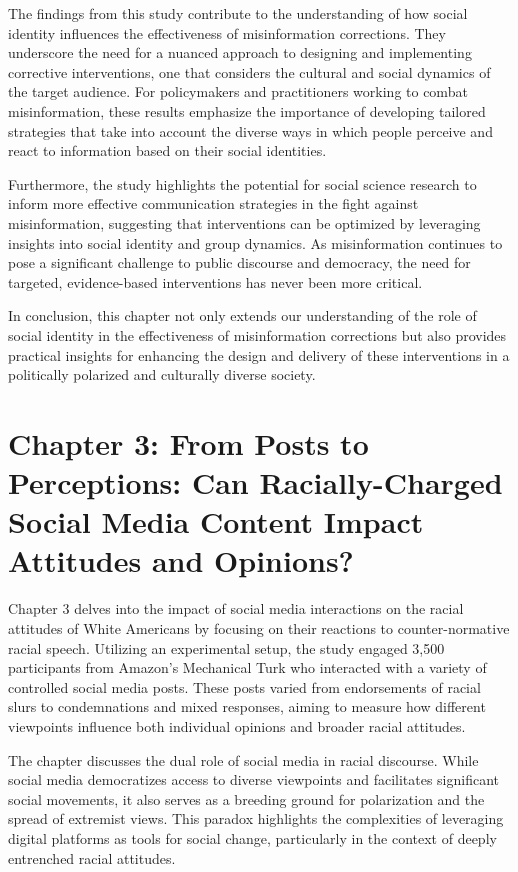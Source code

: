 \documentclass[12pt]{article}[1in]
\begin{document}
The findings from this study contribute to the understanding of how social identity influences the effectiveness of misinformation corrections. They underscore the need for a nuanced approach to designing and implementing corrective interventions, one that considers the cultural and social dynamics of the target audience. For policymakers and practitioners working to combat misinformation, these results emphasize the importance of developing tailored strategies that take into account the diverse ways in which people perceive and react to information based on their social identities.

Furthermore, the study highlights the potential for social science research to inform more effective communication strategies in the fight against misinformation, suggesting that interventions can be optimized by leveraging insights into social identity and group dynamics. As misinformation continues to pose a significant challenge to public discourse and democracy, the need for targeted, evidence-based interventions has never been more critical.

In conclusion, this chapter not only extends our understanding of the role of social identity in the effectiveness of misinformation corrections but also provides practical insights for enhancing the design and delivery of these interventions in a politically polarized and culturally diverse society.

\section*{Chapter 3: From Posts to Perceptions: Can Racially-Charged Social Media Content Impact Attitudes and Opinions?}

Chapter 3 delves into the impact of social media interactions on the racial attitudes of White Americans by focusing on their reactions to counter-normative racial speech. Utilizing an experimental setup, the study engaged 3,500 participants from Amazon's Mechanical Turk who interacted with a variety of controlled social media posts. These posts varied from endorsements of racial slurs to condemnations and mixed responses, aiming to measure how different viewpoints influence both individual opinions and broader racial attitudes.

The chapter discusses the dual role of social media in racial discourse. While social media democratizes access to diverse viewpoints and facilitates significant social movements, it also serves as a breeding ground for polarization and the spread of extremist views. This paradox highlights the complexities of leveraging digital platforms as tools for social change, particularly in the context of deeply entrenched racial attitudes.
\end{document}
